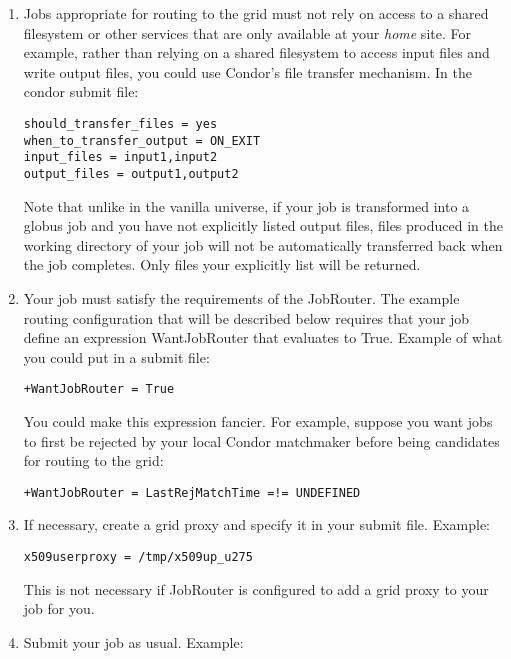 \begin{enumerate}

\item Jobs appropriate for routing to the grid must not rely on access to
a shared filesystem or other services that are only available at your
\textit{home} site.  For example, rather than relying on a shared filesystem
to access input files and write output files, you could use Condor's file
transfer mechanism.  In the condor submit file:

\begin{verbatim}
should_transfer_files = yes
when_to_transfer_output = ON_EXIT
input_files = input1,input2
output_files = output1,output2
\end{verbatim}

Note that unlike in the vanilla universe, if your job is
transformed into a globus job and you have not explicitly listed
output files, files produced in the working directory of your job will
not be automatically transferred back when the job completes.  Only
files your explicitly list will be returned.

\item Your job must satisfy the requirements of the JobRouter.  The example
routing configuration that will be described below requires that your job
define an expression WantJobRouter that evaluates to True.  Example of
what you could put in a submit file:

\begin{verbatim}
+WantJobRouter = True
\end{verbatim}

You could make this expression fancier.  For example, suppose you want
jobs to first be rejected by your local Condor matchmaker before being
candidates for routing to the grid:

\begin{verbatim}
+WantJobRouter = LastRejMatchTime =!= UNDEFINED
\end{verbatim}

\item If necessary, create a grid proxy and specify it in your submit
file.  Example:

\begin{verbatim}
x509userproxy = /tmp/x509up_u275
\end{verbatim}

This is not necessary if JobRouter is configured to add a grid proxy
to your job for you.

\item Submit your job as usual.  Example:


\end{enumerate}
